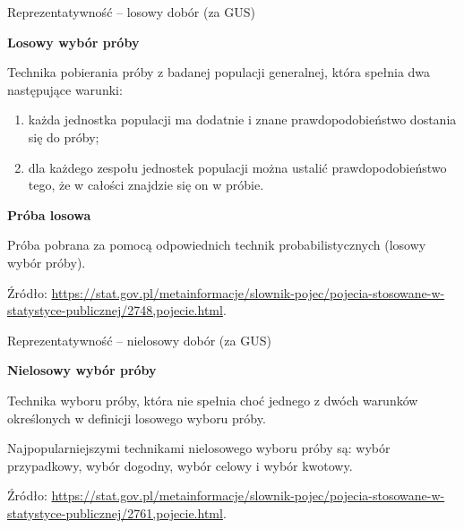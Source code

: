 \documentclass[10pt,ignorenonframetext, aspectratio=169]{beamer}
\begin{document}
\begin{frame}{Reprezentatywność -- losowy dobór (za GUS)}
 
\textbf{Losowy wybór próby}

Technika pobierania próby z badanej populacji generalnej, która spełnia dwa następujące warunki: 
\begin{enumerate}
    \item każda jednostka populacji ma dodatnie i znane prawdopodobieństwo dostania się do próby; 
    \item dla każdego zespołu jednostek populacji można ustalić prawdopodobieństwo tego, że w całości znajdzie się on w próbie. 
\end{enumerate}

\vspace{0.5cm}

\textbf{Próba losowa}

Próba pobrana za pomocą odpowiednich technik probabilistycznych (losowy wybór próby).

\vspace{0.5cm}

Źródło: \url{https://stat.gov.pl/metainformacje/slownik-pojec/pojecia-stosowane-w-statystyce-publicznej/2748,pojecie.html}.

\end{frame}


\begin{frame}{Reprezentatywność -- nielosowy dobór (za GUS)}

\textbf{Nielosowy wybór próby}

Technika wyboru próby, która nie spełnia choć jednego z dwóch warunków określonych w definicji losowego wyboru próby. 

Najpopularniejszymi technikami nielosowego wyboru próby są: wybór przypadkowy, wybór dogodny, wybór celowy i wybór kwotowy.

\vspace{0.5cm}

Źródło: \url{https://stat.gov.pl/metainformacje/slownik-pojec/pojecia-stosowane-w-statystyce-publicznej/2761,pojecie.html}.
\end{frame}
\end{document}
